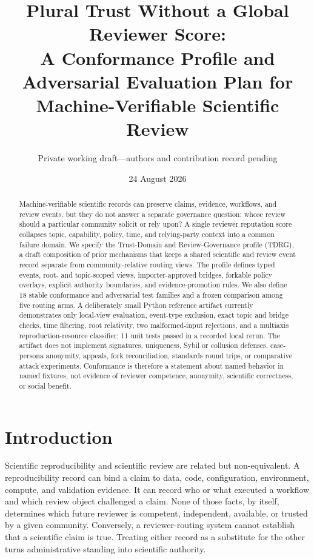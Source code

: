 \documentclass[11pt]{article}
\title{Plural Trust Without a Global Reviewer Score:\\
A Conformance Profile and Adversarial Evaluation Plan for Machine-Verifiable Scientific Review}
\author{Private working draft---authors and contribution record pending}
\date{24 August 2026}
\newcommand{\tdrg}{TDRG}
\begin{document}
\maketitle


\begin{abstract}
Machine-verifiable scientific records can preserve claims, evidence, workflows,
and review events, but they do not answer a separate governance question: whose
review should a particular community solicit or rely upon? A single reviewer
reputation score collapses topic, capability, policy, time, and relying-party
context into a common failure domain. We specify the Trust-Domain and
Review-Governance profile (\tdrg{}), a draft composition of prior mechanisms that
keeps a shared scientific and review event record separate from community-relative
routing views. The profile defines typed events, root- and topic-scoped views,
importer-approved bridges, forkable policy overlays, explicit authority boundaries,
and evidence-promotion rules. We also define 18 stable conformance and adversarial
test families and a frozen comparison among five routing arms. A deliberately
small Python reference artifact currently demonstrates only local-view evaluation,
event-type exclusion, exact topic and bridge checks, time filtering, root relativity,
two malformed-input rejections, and a multiaxis reproduction-resource classifier;
11 unit tests passed in a recorded local rerun. The artifact does not implement
signatures, uniqueness, Sybil or collusion defenses, case-persona anonymity,
appeals, fork reconciliation, standards round trips, or comparative attack
experiments. Conformance is therefore a statement about named behavior in named
fixtures, not evidence of reviewer competence, anonymity, scientific correctness,
or social benefit.
\end{abstract}

\section{Introduction}

Scientific reproducibility and scientific review are related but non-equivalent.
A reproducibility record can bind a claim to data, code, configuration, environment,
compute, and validation evidence. It can record who or what executed a workflow and
which review object challenged a claim. None of those facts, by itself, determines
which future reviewer is competent, independent, available, or trusted by a given
community. Conversely, a reviewer-routing system cannot establish that a scientific
claim is true. Treating either record as a substitute for the other turns
administrative standing into scientific authority.
\end{document}
